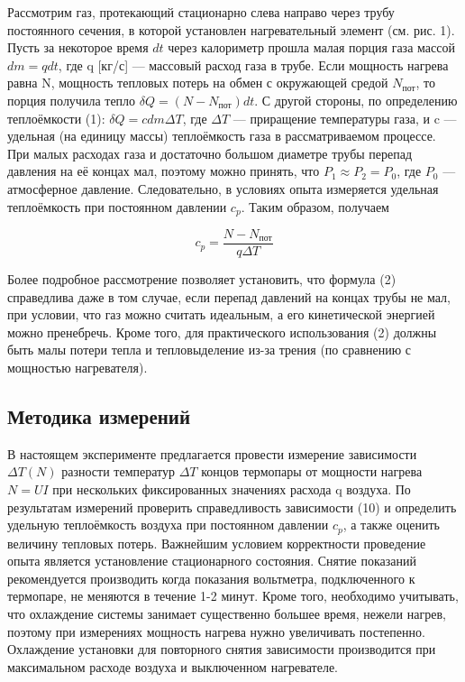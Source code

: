 \documentclass[a4paper,12pt]{article}
\begin{document}
Рассмотрим газ, протекающий стационарно слева направо через трубу постоянного сечения, в которой установлен нагревательный элемент (см. рис. 1). Пусть за некоторое время $dt$ через калориметр прошла малая порция газа массой $dm=qdt$, где q [кг/с] — массовый расход газа в трубе. Если мощность нагрева равна N, мощность тепловых потерь на обмен с окружающей средой $N_\text{пот}$, то порция получила тепло $\delta Q = (N-N_\text{пот})dt$. С другой стороны, по определению теплоёмкости (1): $\delta Q = c dm \Delta T$, где $\Delta T$ — приращение температуры газа, и c — удельная (на единицу массы) теплоёмкость газа в рассматриваемом процессе. При малых расходах газа и достаточно большом диаметре трубы перепад давления на её концах мал, поэтому можно принять, что $P_1 \approx P_2 = P_0$, где $P_0$ — атмосферное давление. Следовательно, в условиях опыта измеряется удельная теплоёмкость при постоянном давлении $c_p$. Таким образом, получаем

\begin{equation}
    c_p = \frac{N-N_\text{пот}}{q \Delta T}
\end{equation}

Более подробное рассмотрение позволяет установить, что формула (2) справедлива даже в том случае, если перепад давлений на концах трубы не мал, при условии, что газ можно считать идеальным, а его кинетической энергией можно пренебречь. Кроме того, для практического использования (2) должны быть малы потери тепла и тепловыделение из-за трения (по сравнению с мощностью нагревателя).

\subsection{Методика измерений}

В настоящем эксперименте предлагается провести измерение зависимости $\Delta T (N)$ разности температур $\Delta T$ концов термопары от мощности нагрева $N = UI$ при нескольких фиксированных значениях расхода q воздуха. По результатам измерений проверить справедливость зависимости (10) и определить удельную теплоёмкость воздуха при постоянном давлении $c_p$, а также оценить величину тепловых потерь. Важнейшим условием корректности проведение опыта является установление стационарного состояния. Снятие показаний рекомендуется производить когда показания вольтметра, подключенного к термопаре, не меняются в течение 1-2 минут. Кроме того, необходимо учитывать, что охлаждение системы занимает существенно большее время, нежели нагрев, поэтому при измерениях мощность нагрева нужно увеличивать постепенно. Охлаждение установки для повторного снятия зависимости производится при максимальном расходе воздуха и выключенном нагревателе.
\end{document}
